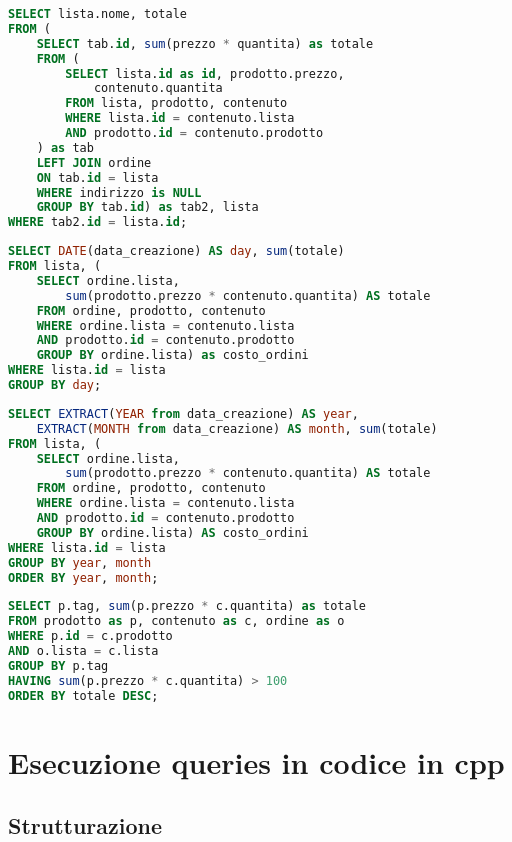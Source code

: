 \documentclass[11pt]{article}
\begin{document}
\begin{lstlisting}[language=SQL]
SELECT lista.nome, totale 
FROM (
	SELECT tab.id, sum(prezzo * quantita) as totale
	FROM (
		SELECT lista.id as id, prodotto.prezzo, 
			contenuto.quantita
		FROM lista, prodotto, contenuto
		WHERE lista.id = contenuto.lista
		AND prodotto.id = contenuto.prodotto
	) as tab 
	LEFT JOIN ordine
	ON tab.id = lista
	WHERE indirizzo is NULL
	GROUP BY tab.id) as tab2, lista
WHERE tab2.id = lista.id;
\end{lstlisting}




\begin{lstlisting}[language=SQL]
SELECT DATE(data_creazione) AS day, sum(totale)
FROM lista, (
	SELECT ordine.lista, 
		sum(prodotto.prezzo * contenuto.quantita) AS totale
	FROM ordine, prodotto, contenuto
	WHERE ordine.lista = contenuto.lista
	AND prodotto.id = contenuto.prodotto
	GROUP BY ordine.lista) as costo_ordini
WHERE lista.id = lista
GROUP BY day;
\end{lstlisting}





\begin{lstlisting}[language=SQL]
SELECT EXTRACT(YEAR from data_creazione) AS year, 
	EXTRACT(MONTH from data_creazione) AS month, sum(totale)
FROM lista, (
	SELECT ordine.lista, 
		sum(prodotto.prezzo * contenuto.quantita) AS totale
	FROM ordine, prodotto, contenuto
	WHERE ordine.lista = contenuto.lista
	AND prodotto.id = contenuto.prodotto
	GROUP BY ordine.lista) AS costo_ordini
WHERE lista.id = lista
GROUP BY year, month
ORDER BY year, month;
\end{lstlisting}





\begin{lstlisting}[language=SQL]
SELECT p.tag, sum(p.prezzo * c.quantita) as totale
FROM prodotto as p, contenuto as c, ordine as o
WHERE p.id = c.prodotto
AND o.lista = c.lista
GROUP BY p.tag
HAVING sum(p.prezzo * c.quantita) > 100
ORDER BY totale DESC;
\end{lstlisting}

\section{Esecuzione queries in codice in cpp}
\subsection{Strutturazione}
\end{document}
